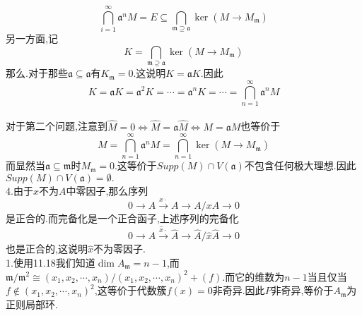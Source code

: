 \documentclass[b5paper]{ctexart}
\begin{document}
\[\bigcap_{i=1}^{\infty}\mathfrak{a}^nM=E\subseteq \bigcap_{\mathfrak{m}\supseteq \mathfrak{a}}\ker(M\to M_{\mathfrak{m}})\]
另一方面,记
\[K=\bigcap_{\mathfrak{m}\supseteq \mathfrak{a}}\ker(M\to M_{\mathfrak{m}})\]
那么.对于那些$\mathfrak{a}\subseteq\mathfrak{a}$有$K_{\mathfrak{m}}=0$.这说明$K=\mathfrak{a}K$.因此
\[K=\mathfrak{a}K=\mathfrak{a}^2K=\cdots=\mathfrak{a}^nK=\cdots=\bigcap_{n=1}^\infty \mathfrak{a}^nM\]\\
对于第二个问题,注意到$\hat{M}=0\Leftrightarrow \hat{M}=\mathfrak{a}\hat{M}\Leftrightarrow M=\mathfrak{a}M$也等价于
\[M=\bigcap_{n=1}^\infty\mathfrak{a}^nM=\bigcap_{n=1}^\infty \ker(M\to M_{\mathfrak{m}})\]
而显然当$\mathfrak{a}\subseteq \mathfrak{m}$时$M_{\mathfrak{m}}=0$.这等价于$Supp(M)\cap V(\mathfrak{a})$不包含任何极大理想.因此$Supp(M)\cap V(\mathfrak{a})=\emptyset.$\\
4.由于$x$不为$A$中零因子,那么序列
\[0\to A\xrightarrow{x\cdot}A\to A/xA\to 0\]
是正合的.而完备化是一个正合函子,上述序列的完备化
\[0\to \hat{A}\xrightarrow{\hat{x}\cdot}\hat{A}\to \hat{A}/\hat{x}\hat{A}\to 0\]
也是正合的,这说明$\hat{x}$不为零因子.\\
1.使用11.18我们知道$\dim A_{\mathfrak{m}}=n-1$,而$\mathfrak{m}/\mathfrak{m}^2\cong (x_1,x_2,\cdots,x_n)/(x_1,x_2,\cdots,x_n)^2+(f)$.而它的维数为$n-1$当且仅当$f\not\in(x_1,x_2,\cdots,x_n)^2$,这等价于代数簇$f(x)=0$非奇异.因此$P$非奇异,等价于$A_{\mathfrak{m}}$为正则局部环.
\end{document}
